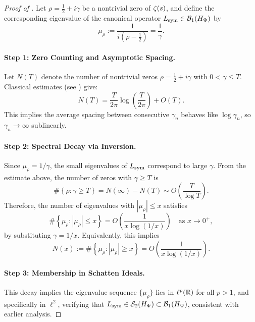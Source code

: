 \begin{proof}[Proof of ]
Let \( \rho = \tfrac{1}{2} + i\gamma \) be a nontrivial zero of \( \zeta(s) \), and define the corresponding eigenvalue of the canonical operator \( L_{\mathrm{sym}} \in \mathcal{B}_1(H_{\Psi}) \) by
\[
\mu_\rho := \frac{1}{i(\rho - \tfrac{1}{2})} = \frac{1}{\gamma}.
\]

\paragraph{Step 1: Zero Counting and Asymptotic Spacing.}
Let \( N(T) \) denote the number of nontrivial zeros \( \rho = \tfrac{1}{2} + i\gamma \) with \( 0 < \gamma \leq T \). Classical estimates (see \cite{Titchmarsh1986Zeta}) give:
\[
N(T) = \frac{T}{2\pi} \log \left( \frac{T}{2\pi} \right) + O(T).
\]
This implies the average spacing between consecutive \( \gamma_n \) behaves like \( \log \gamma_n \), so \( \gamma_n \to \infty \) sublinearly.

\paragraph{Step 2: Spectral Decay via Inversion.}
Since \( \mu_\rho = 1/\gamma \), the small eigenvalues of \( L_{\mathrm{sym}} \) correspond to large \( \gamma \). From the estimate above, the number of zeros with \( \gamma \geq T \) is
\[
\#\left\{ \rho : \gamma \geq T \right\} = N(\infty) - N(T) \sim O\left( \frac{T}{\log T} \right).
\]
Therefore, the number of eigenvalues with \( |\mu_\rho| \leq x \) satisfies
\[
\#\left\{ \mu_\rho : |\mu_\rho| \leq x \right\} = O\left( \frac{1}{x \log(1/x)} \right)
\quad \text{as } x \to 0^+,
\]
by substituting \( \gamma = 1/x \). Equivalently, this implies
\[
N(x) := \#\left\{ \mu_\rho : |\mu_\rho| \geq x \right\} = O\left( \frac{1}{x \log(1/x)} \right).
\]

\paragraph{Step 3: Membership in Schatten Ideals.}
This decay implies the eigenvalue sequence \( \{ \mu_\rho \} \) lies in \( \ell^p(\mathbb{R}) \) for all \( p > 1 \), and specifically in \( \ell^2 \), verifying that \( L_{\mathrm{sym}} \in \mathcal{S}_2(H_{\Psi}) \subset \mathcal{B}_1(H_{\Psi}) \), consistent with earlier analysis.

\end{proof}
